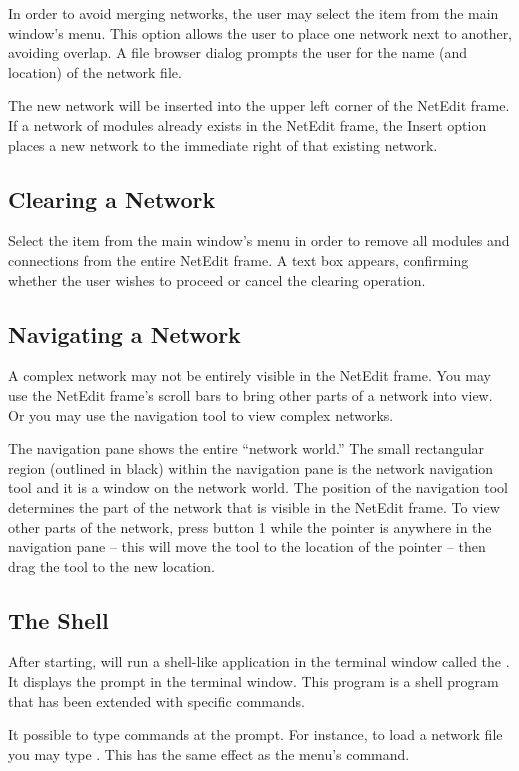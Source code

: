In order to avoid merging networks, the user may select the
 item from the main window's  menu. This
option allows the user to place one \sr{} network next to another,
avoiding overlap.  A file browser dialog prompts the user for the name (and
location) of the network file.

The new network will be inserted into the upper left corner of the NetEdit
frame.  If a network of modules already exists in the NetEdit frame, the
Insert option places a new network to the immediate right of that existing
network. 

\subsection{Clearing a Network}
\label{sec:clearnetwork}

Select the  item from the main window's  menu in
order to remove all modules and connections from the entire NetEdit frame.
A text box appears, confirming whether the user wishes to proceed or cancel
the clearing operation.

\subsection{Navigating a Network}
\label{sec:navnetwork}

A complex network may not be entirely visible in the NetEdit frame.  You may
use the NetEdit frame's scroll bars to bring other parts of a network into
view.  Or you may use the navigation tool to view complex networks.

The navigation pane shows the entire ``network world.''  The small
rectangular region (outlined in black) within the navigation pane is the
network navigation tool and it is a window on the network world.  The
position of the navigation tool determines the part of the network that is
visible in the NetEdit frame.  To view other parts of the network, press
button 1 while the pointer is anywhere in the navigation pane -- this will
move the tool to the location of the pointer --  then drag the tool to the
new location.


\subsection{The \sr{} Shell}
\label{sec:termapp}

After starting, \sr{} will run a shell-like application in the terminal
window called the .  It displays the prompt
 in the terminal window.  This program is a
 shell program that has been extended with
\sr{} specific commands.

It possible to type \tcl{} \sr{} commands at the prompt.  For
instance, to load a network file you may type .  This has the same effect as the 
menu's  command.




